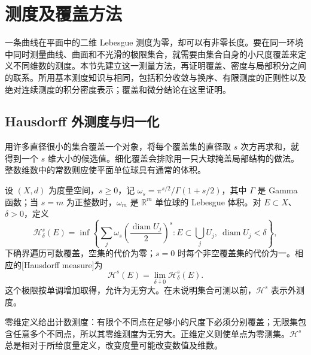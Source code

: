 
% 
% 

\section{测度及覆盖方法}
\label{g3:sec:2001}

一条曲线在平面中的二维 Lebesgue 测度为零，却可以有非零长度。要在同一环境中同时测量曲线、曲面和不光滑的极限集合，就需要由集合自身的小尺度覆盖来定义不同维数的测度。本节先建立这一测量方法，再证明覆盖、密度与局部积分之间的联系。所用基本测度知识与相同，包括积分收敛与换序、有限测度的正则性以及绝对连续测度的积分密度表示；覆盖和微分结论在这里证明。

\subsection{Hausdorff 外测度与归一化}
\label{g3:subsec:2001:01}
用许多直径很小的集合覆盖一个对象，将每个覆盖集的直径取 \(s\) 次方再求和，就得到一个 \(s\) 维大小的候选值。细化覆盖会排除用一只大球掩盖局部结构的做法。整数维数中的常数则应使平面单位球具有通常的体积。

\begin{definition}\label{g3:def:hausdorff-measure}
	设 \((X,d)\) 为度量空间，\(s\ge0\)，记
	\(\omega_s=\pi^{s/2}/\Gamma(1+s/2)\)，其中 \(\Gamma\) 是 Gamma 函数；当 \(s=m\) 为正整数时，\(\omega_m\) 是 \(\mathbb R^m\) 单位球的 Lebesgue 体积。对 \(E\subset X\)、\(\delta>0\)，定义
	\[
		\mathcal H^s_\delta(E)=
		\inf\left\{\sum_j\omega_s\left(\frac{\operatorname{diam}U_j}{2}\right)^s:
		E\subset\bigcup_jU_j,\ \operatorname{diam}U_j<\delta\right\},
	\]
	下确界遍历可数覆盖，空集的代价为零；\(s=0\) 时每个非空覆盖集的代价为一。相应的[Hausdorff measure]为
	\begin{equation}\label{g3:eq:hausdorff-measure-definition}
		\mathcal H^s(E)=\lim_{\delta\downarrow0}\mathcal H^s_\delta(E).
	\end{equation}
	这个极限按单调增加取得，允许为无穷大。在未说明集合可测以前，\(\mathcal H^s\) 表示外测度。
\end{definition}

零维定义给出计数测度：有限个不同点在足够小的尺度下必须分别覆盖；无限集包含任意多个不同点，所以其零维测度为无穷大。正维定义则使单点为零测集。\(\mathcal H^s\) 总是相对于所给度量定义，改变度量可能改变数值及维数。

